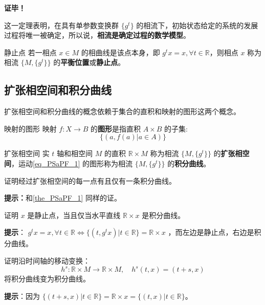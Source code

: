 \textbf{证毕！}

这一定理表明，在具有单参数变换群 $\{g^t\}$ 的相流下，初始状态给定的系统的发展过程将唯一被确定，所以说，\textbf{相流是确定过程的数学模型}。
\begin{definition}{静止点}
若一相点 $x\in M$ 的相曲线是该点本身，即 $g^t x=x,\forall t\in\mathbb R$，则相点 $x$ 称为相流 $\{M,\{g^t\}\}$ 的\textbf{平衡位置}或\textbf{静止点}。
\end{definition}
\subsection{扩张相空间和积分曲线}
扩张相空间和积分曲线的概念依赖于集合的直积和映射的图形这两个概念。
\begin{definition}{映射的图形}
映射 $f:X\rightarrow B$ 的\textbf{图形}是指直积 $A\times B$ 的子集:
\begin{equation}
\{(a,f(a)|a\in A)\}
\end{equation}
\end{definition}
\begin{definition}{扩张相空间}
实 $t$ 轴和相空间 $M$ 的直积 $\mathbb R\times M$ 称为相流 $\{M,\{g^t\}\}$ 的\textbf{扩张相空间}，运动\autoref{eq_PSaPF_1} 的图形称为相流 $\{M,\{g^t\}\}$ 的\textbf{积分曲线}。
\end{definition}
\begin{exercise}{}
证明经过扩张相空间的每一点有且仅有一条积分曲线。
\end{exercise}
\textbf{提示：}和\autoref{the_PSaPF_1} 同样的证。

\begin{exercise}{}
证明 $x$ 是静止点，当且仅当水平直线 $\mathbb R\times x$ 是积分曲线。
\end{exercise}
\textbf{提示}： $g^t x=x,\forall t\in\mathbb R\Leftrightarrow\{(t,g^t x)|t\in \mathbb R\}=\mathbb R\times x$ ，而左边是静止点，右边是积分曲线。
\begin{exercise}{}
证明沿时间轴的移动变换：
\begin{equation}
h^s:\mathbb R\times M\rightarrow\mathbb R\times M,\quad h^s(t,x)=(t+s,x)
\end{equation}
将积分曲线变为积分曲线。
\end{exercise}
\textbf{提示}：因为 $\{(t+s,x)|t\in\mathbb R\}=\mathbb R\times x=\{(t,x)|t\in\mathbb R\}$。